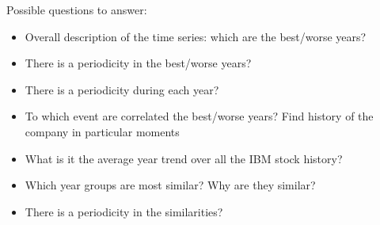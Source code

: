 \documentclass[a4paper,11pt,final]{article}
\begin{document}
Possible questions to answer:
\begin{itemize}
\item Overall description of the time series: which are the best/worse years?  
\item There is a periodicity in the best/worse years?
\item There is a periodicity during each year?
\item To which event are correlated the best/worse years? Find history 
  of the company in particular moments
  
\item What is it the average year trend over all the IBM stock history? 
\item Which year groups are most similar? Why are they similar?
\item There is a periodicity in the similarities?  
  
  
  
\end{itemize}
\end{document}
